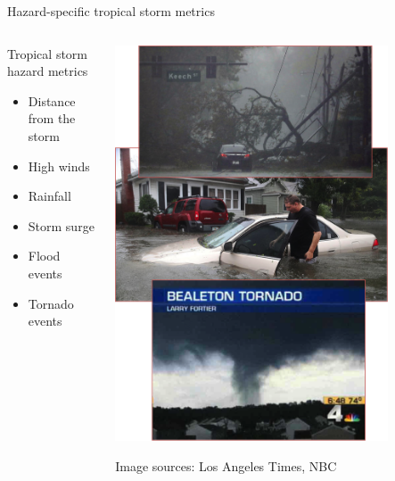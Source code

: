 \documentclass[ignorenonframetext,]{beamer}
\begin{document}
\begin{frame}{Hazard-specific tropical storm metrics}

\begin{columns}
\begin{column}{0.5\textwidth}
\begin{block}{Tropical storm hazard metrics}
   \begin{itemize}
    \item Distance from the storm
    \item High winds
    \item Rainfall
    \item Storm surge
    \item Flood events
    \item Tornado events
   \end{itemize}
\end{block}
\end{column}
\begin{column}{0.5\textwidth}  
    \vspace{-0.25cm}
    \begin{center}
     \includegraphics[width=0.8\textwidth]{storm_hazards.png}
     \end{center}
     \vspace{-0.25cm}
     \scriptsize{Image sources: Los Angeles Times, NBC}
\end{column}
\end{columns}

\end{frame}
\end{document}
